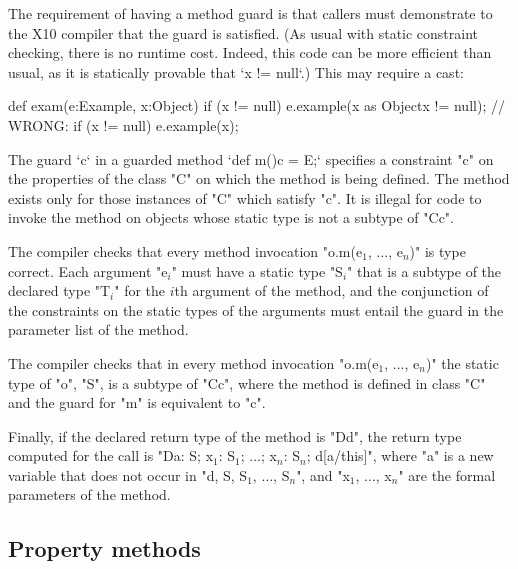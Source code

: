 The requirement of having a method guard is that callers must demonstrate to
the X10
compiler that the guard is satisfied.  (As usual with static constraint
checking, there is no runtime cost.  Indeed, this code can be more efficient
than usual, as it is statically provable that \xcd`x != null`.)
This may require a cast: 
\begin{xten}
  def exam(e:Example, x:Object) {
    if (x != null) 
       e.example(x as Object{x != null});
    // WRONG: if (x != null) e.example(x);
  }
\end{xten}

The guard \xcd`{c}` 
in a guarded method 
\xcd`def m(){c} = E;`
specifies a constraint \xcd"c" on the
properties of the class \xcd"C" on which the method is being defined. The
method exists only for those instances of \xcd"C" which satisfy \xcd"c".  It is
illegal for code to invoke the method on objects whose static type is
not a subtype of \xcd"C{c}".

\begin{staticrule*}
    The compiler checks that every method invocation
    \xcdmath"o.m(e$_1$, $\dots$, e$_n$)"
    is type correct. Each argument
    \xcdmath"e$_i$" must have a
    static type \xcdmath"S$_i$" that is a subtype of the declared type
    \xcdmath"T$_i$" for the $i$th
    argument of the method, and the conjunction of the constraints on the
    static types 
    of the arguments must entail the guard in the parameter list
    of the method.

    The compiler checks that in every method invocation
    \xcdmath"o.m(e$_1$, $\dots$, e$_n$)"
    the static type of \xcd"o", \xcd"S", is a subtype of \xcd"C{c}", where the method
    is defined in class \xcd"C" and the guard for \xcd"m" is equivalent to
    \xcd"c".

    Finally, if the declared return type of the method is
    \xcd"D{d}", the
    return type computed for the call is
    \xcdmath"D{a: S; x$_1$: S$_1$; $\dots$; x$_n$: S$_n$; d[a/this]}",
    where \xcd"a" is a new
    variable that does not occur in
    \xcdmath"d, S, S$_1$, $\dots$, S$_n$", and
    \xcdmath"x$_1$, $\dots$, x$_n$" are the formal
    parameters of the method.
\end{staticrule*}


\subsection{Property methods}

